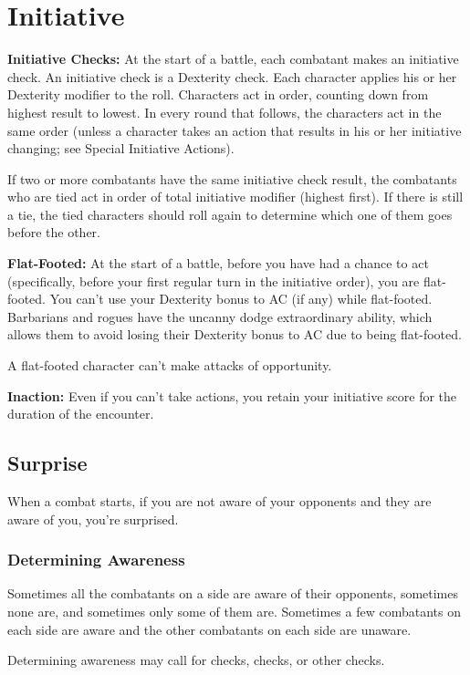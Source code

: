 \section{Initiative}

\textbf{Initiative Checks:} At the start of a battle, each combatant makes an initiative check. An initiative check is a Dexterity check. Each character applies his or her Dexterity modifier to the roll. Characters act in order, counting down from highest result to lowest. In every round that follows, the characters act in the same order (unless a character takes an action that results in his or her initiative changing; see Special Initiative Actions).

If two or more combatants have the same initiative check result, the combatants who are tied act in order of total initiative modifier (highest first). If there is still a tie, the tied characters should roll again to determine which one of them goes before the other.

\textbf{Flat-Footed:} At the start of a battle, before you have had a chance to act (specifically, before your first regular turn in the initiative order), you are flat-footed. You can't use your Dexterity bonus to AC (if any) while flat-footed. Barbarians and rogues have the uncanny dodge extraordinary ability, which allows them to avoid losing their Dexterity bonus to AC due to being flat-footed.

A flat-footed character can't make attacks of opportunity.

\textbf{Inaction:} Even if you can't take actions, you retain your initiative score for the duration of the encounter.


\subsection{Surprise}
When a combat starts, if you are not aware of your opponents and they are aware of you, you're surprised.

\subsubsection{Determining Awareness}
Sometimes all the combatants on a side are aware of their opponents, sometimes none are, and sometimes only some of them are. Sometimes a few combatants on each side are aware and the other combatants on each side are unaware.

Determining awareness may call for  checks,  checks, or other checks.

